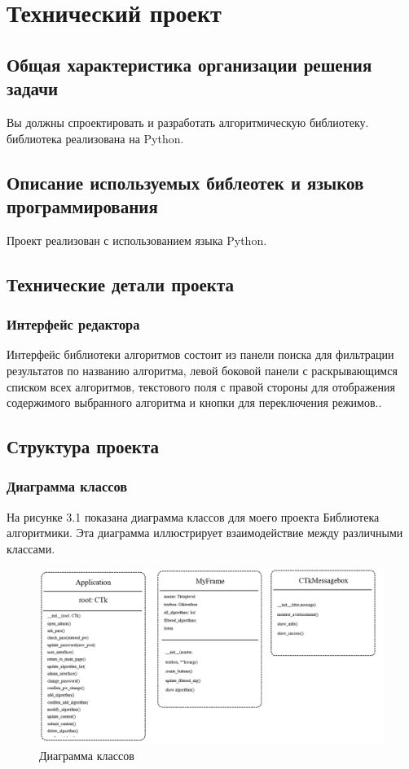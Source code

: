 \section{Технический проект}
\subsection{Общая характеристика организации решения задачи}
Вы должны спроектировать и разработать алгоритмическую библиотеку. библиотека реализована на Python.

\subsection{Описание используемых библеотек и языков программирования}
Проект реализован с использованием языка Python.


\subsection{Технические детали проекта}
\subsubsection{Интерфейс редактора}
Интерфейс библиотеки алгоритмов состоит из панели поиска для фильтрации результатов по названию алгоритма, левой боковой панели с раскрывающимся списком всех алгоритмов, текстового поля с правой стороны для отображения содержимого выбранного алгоритма и кнопки для переключения режимов..

\subsection{Структура проекта}

\subsubsection{Диаграмма классов}
На рисунке 3.1 показана диаграмма классов для моего проекта Библиотека алгоритмики. Эта диаграмма иллюстрирует взаимодействие между различными классами.


\begin{figure}[H]
	\centering
	\includegraphics[width=0.9\linewidth]{images/classes}
	\caption{Диаграмма классов}
	\label{fig:classdiag}
\end{figure}


